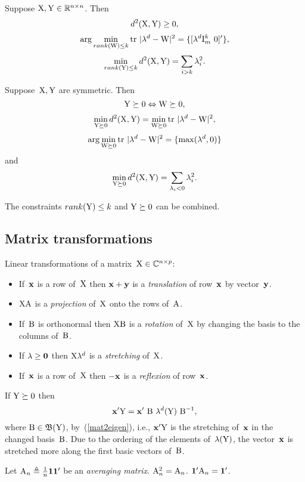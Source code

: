 \documentclass[10pt,a4paper]{article}
\theoremstyle{plain} \newtheorem{Lem}{Lemma}
\begin{document}
Suppose $\mathrm X, \mathrm Y \in \mathbb R^{n \times n}$.
Then
$$ d^2(\mathrm X,\mathrm Y) \ge 0, $$
$$ \arg \min_{rank(\mathrm W) \le k} \mathrm {tr} \  |\mathbf \lambda^d -\mathrm W|^2 = \{[\mathbf \lambda^d \mathrm I_m^k \ \mathrm 0]' \}, $$
$$ \min_{rank(\mathrm Y) \le k} d^2 (\mathrm X, \mathrm Y) = \sum_{i > k} \lambda_i^2. $$

Suppose~$\mathrm X, \mathrm Y$ are symmetric.
Then 
$$ \mathrm Y \succeq 0 \Leftrightarrow \mathrm W \succeq 0, $$
$$ \min_{\mathrm Y \succeq 0} d^2 (\mathrm X, \mathrm Y) = \min_{\mathrm W \succeq 0} \mathrm {tr} \  |\mathbf \lambda^d -\mathrm W|^2, $$
$$ \arg \min_{\mathrm W \succeq 0} \mathrm {tr} \  |\mathbf \lambda^d -\mathrm W|^2 = \{\max (\mathbf \lambda^d, \mathrm 0) \} $$
and
$$ \min_{\mathrm Y \succeq 0} d^2 (\mathrm X, \mathrm Y) = \sum_{\lambda_i < 0} \lambda_i^2. $$

The constraints $rank(\mathrm Y) \le k$ and $\mathrm Y \succeq 0$ can be combined.



\subsection{Matrix transformations}
Linear transformations of a matrix~$\mathrm X \in \mathbb C^{n \times p}$:
\begin{itemize}
\item If~$\mathbf x$ is a row of~$\mathrm X$ then $\mathbf x + \mathbf y$ is a {\em translation} of row~$\mathbf x$ by vector~$\mathbf y$.
\item $\mathrm X \mathrm A$ is a {\em projection} of~$\mathrm X$ onto the rows of~$\mathrm A$.
\item If~$\mathrm B$ is orthonormal then $\mathrm X \mathrm B$ is a {\em rotation} of~$\mathrm X$ by changing the basis to the columns of~$\mathrm B$.
\item If $\mathbf \lambda \ge \mathbf 0$ then $\mathrm X \mathbf \lambda^d$ is a {\em stretching} of~$\mathrm X$.
\item If~$\mathbf x$ is a row of~$\mathrm X$ then $- \mathbf x$ is a {\em reflexion} of row~$\mathbf x$.
\end{itemize}

If $\mathrm Y \succeq 0$ then 
$$ \mathbf x' \mathrm Y =  \mathbf x' \ \mathrm B \ \mathbf \lambda^d(\mathrm Y) \ \mathrm B^{-1}, $$
where $\mathrm B \in \mathfrak B(\mathrm Y)$,
by~(\ref{mat2eigen}),
i.e., $\mathbf x' \mathrm Y$ is the stretching of~$\mathbf x$ in the changed basis~$\mathrm B$.
Due to the ordering of the elements of~$\mathbf \lambda(\mathrm Y)$, the vector~$\mathbf x$ is stretched more along the first basic vectors of~$\mathrm B$.

Let $\mathrm A_n \triangleq \frac 1 n \mathbf 1 \mathbf 1'$ be an {\em averaging matrix}.
$\mathrm A^2_n = \mathrm A_n$.
$ \mathbf 1' \mathrm A_n = \mathbf 1'$.
\end{document}
